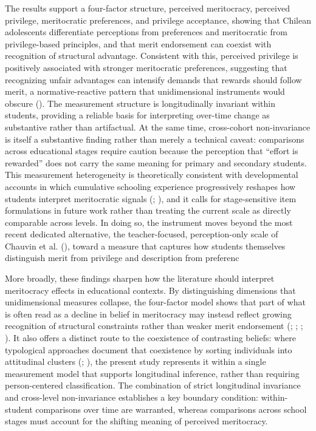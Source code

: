 \documentclass[
  13pt,
]{article}
\begin{document}
The results support a four-factor structure, perceived meritocracy,
perceived privilege, meritocratic preferences, and privilege acceptance,
showing that Chilean adolescents differentiate perceptions from
preferences and meritocratic from privilege-based principles, and that
merit endorsement can coexist with recognition of structural advantage.
Consistent with this, perceived privilege is positively associated with
stronger meritocratic preferences, suggesting that recognizing unfair
advantages can intensify demands that rewards should follow merit, a
normative-reactive pattern that unidimensional instruments would obscure
().
The measurement structure is longitudinally invariant within students,
providing a reliable basis for interpreting over-time change as
substantive rather than artifactual. At the same time, cross-cohort
non-invariance is itself a substantive finding rather than merely a
technical caveat: comparisons across educational stages require caution
because the perception that ``effort is rewarded'' does not carry the
same meaning for primary and secondary students. This measurement
heterogeneity is theoretically consistent with developmental accounts in
which cumulative schooling experience progressively reshapes how
students interpret meritocratic signals
(;
), and it calls
for stage-sensitive item formulations in future work rather than
treating the current scale as directly comparable across levels. In
doing so, the instrument moves beyond the most recent dedicated
alternative, the teacher-focused, perception-only scale of Chauvin et
al. (), toward a measure that
captures how students themselves distinguish merit from privilege and
description from preferenc

More broadly, these findings sharpen how the literature should interpret
meritocracy effects in educational contexts. By distinguishing
dimensions that unidimensional measures collapse, the four-factor model
shows that part of what is often read as a decline in belief in
meritocracy may instead reflect growing recognition of structural
constraints rather than weaker merit endorsement
(;
;
;
). It also offers a
distinct route to the coexistence of contrasting beliefs: where
typological approaches document that coexistence by sorting individuals
into attitudinal clusters
(;
), the present study
represents it within a single measurement model that supports
longitudinal inference, rather than requiring person-centered
classification. The combination of strict longitudinal invariance and
cross-level non-invariance establishes a key boundary condition:
within-student comparisons over time are warranted, whereas comparisons
across school stages must account for the shifting meaning of perceived
meritocracy.
\end{document}
